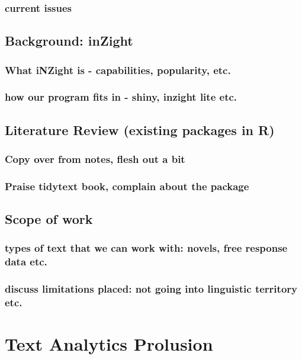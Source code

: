 \documentclass[11pt, a4paper, oneside]{report}
\begin{document}
\subsection{current issues}

\section{Background: inZight}
\label{sec:background:-inzight}
\subsection{What iNZight is - capabilities, popularity, etc.}
\subsection{how our program fits in - shiny, inzight lite etc.}

\section{Literature Review (existing packages in R)}
\label{sec:liter-revi-exist}

\subsection{Copy over from notes, flesh out a bit}
\subsection{Praise tidytext book, complain about the package}

\section{Scope of work}
\label{sec:scope-work}

\subsection{types of text that we can work with: novels, free response data etc.}
\subsection{discuss limitations placed: not going into linguistic territory etc.}

\chapter{Text Analytics Prolusion}
\label{cha:text-analyt-backgr}
\end{document}
